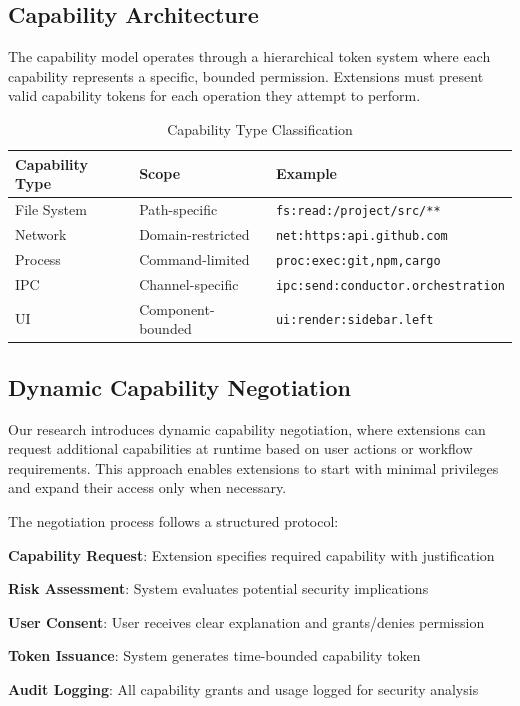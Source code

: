 \subsection*{Capability Architecture}

The capability model operates through a hierarchical token system where each capability represents a specific, bounded permission. Extensions must present valid capability tokens for each operation they attempt to perform.

\begin{table}[ht]
\centering
\begin{tabular}{@{}lll@{}}
\toprule
\textbf{Capability Type} & \textbf{Scope} & \textbf{Example} \\
\midrule
File System & Path-specific & \texttt{fs:read:/project/src/**} \\
Network & Domain-restricted & \texttt{net:https:api.github.com} \\
Process & Command-limited & \texttt{proc:exec:git,npm,cargo} \\
IPC & Channel-specific & \texttt{ipc:send:conductor.orchestration} \\
UI & Component-bounded & \texttt{ui:render:sidebar.left} \\
\bottomrule
\end{tabular}
\caption{Capability Type Classification}
\end{table}

\subsection*{Dynamic Capability Negotiation}

Our research introduces dynamic capability negotiation, where extensions can request additional capabilities at runtime based on user actions or workflow requirements. This approach enables extensions to start with minimal privileges and expand their access only when necessary.

The negotiation process follows a structured protocol:

\begin{expandedlist}
    \item \textbf{Capability Request}: Extension specifies required capability with justification
    \item \textbf{Risk Assessment}: System evaluates potential security implications
    \item \textbf{User Consent}: User receives clear explanation and grants/denies permission
    \item \textbf{Token Issuance}: System generates time-bounded capability token
    \item \textbf{Audit Logging}: All capability grants and usage logged for security analysis
\end{expandedlist}

